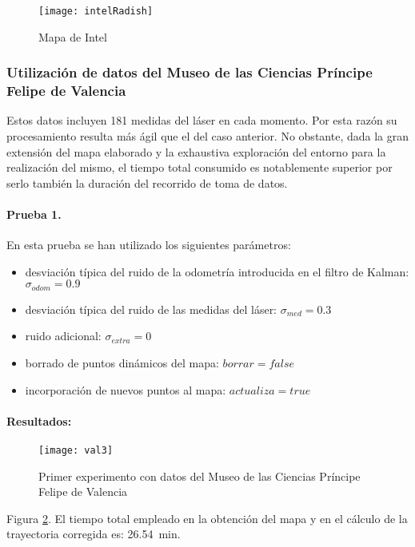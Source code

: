 \begin{figure}[hbtp]
  \centering\texttt{[image: intelRadish]}\\
  \caption{Mapa de Intel \cite{Radish}}\label{fg:intelRadish}
\end{figure}

\clearpage
\subsubsection{Utilización de datos del Museo de las Ciencias Príncipe Felipe de Valencia}

Estos datos incluyen 181 medidas del láser en cada momento. Por esta razón su procesamiento resulta más ágil que el del caso anterior. No obstante, dada la gran extensión del mapa elaborado y la exhaustiva exploración del entorno para la realización del mismo, el tiempo total consumido es notablemente superior por serlo también la duración del recorrido de toma de datos.

\paragraph{Prueba 1.}
En esta prueba se han utilizado los siguientes parámetros:
\begin{itemize}
  \item desviación típica del ruido de la odometría introducida en el filtro de Kalman: $\sigma_{odom} = 0.9$
  \item desviación típica del ruido de las medidas del láser: $\sigma_{med} = 0.3$
  \item ruido adicional: $\sigma_{extra} = 0$
  \item borrado de puntos dinámicos del mapa: $borrar = false$
  \item incorporación de nuevos puntos al mapa: $actualiza = true$
\end{itemize}


\paragraph{Resultados:}
\begin{figure}[h]
  \centering\texttt{[image: val3]}\\
  \caption{Primer experimento con datos del Museo de las Ciencias Príncipe Felipe de Valencia}\label{fg:val3}
\end{figure}

Figura \ref{fg:val3}. El tiempo total empleado en la obtención del mapa y en el cálculo de la trayectoria corregida es: 26.54~min.


